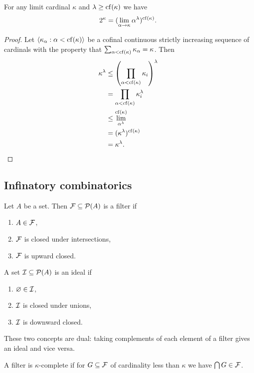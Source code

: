 \begin{proposition}
    For any limit cardinal \(\kappa\) and \(\lambda\geq\operatorname{cf}(\kappa)\) we have
    \[
        2^{\kappa}=(\lim_{\alpha\to\kappa}\alpha^{\lambda})^{\operatorname{cf}(\kappa)}.
    \]

    \begin{proof}
        Let \(\left<\kappa_{\alpha}:\alpha<\operatorname{cf}(\kappa)\right>\) be a cofinal
        continuous strictly increasing sequence of cardinals with the property
        that \(\sum_{\alpha<\operatorname{cf}(\kappa)}\kappa_{\alpha}=\kappa\). Then
        \begin{align*}
            \kappa^{\lambda} & \leq\left(\prod_{\alpha<\operatorname{cf}(\kappa)}\kappa_{i}\right)^{\lambda} \\
                             & =\prod_{\alpha<\operatorname{cf}(\kappa)}\kappa_{i}^{\lambda}                 \\
                             & \leq\lim_{\alpha^{\lambda}}^{\operatorname{cf}(\kappa)}                       \\
                             & =(\kappa^{\lambda})^{\operatorname{cf}(\kappa)}                               \\
                             & =\kappa^{\lambda}.
        \end{align*}
    \end{proof}
\end{proposition}

\subsection{Infinatory combinatorics}
\begin{definition}
    Let \(A\) be a set. Then \(\mathcal{F}\subseteq\mathcal{P}(A)\) is a filter
    if
    \begin{enumerate}
        \item \(A\in\mathcal{F}\),
        \item \(\mathcal{F}\) is closed under intersections,
        \item \(\mathcal{F}\) is upward closed.
    \end{enumerate}
    A set \(\mathcal{I}\subseteq\mathcal{P}(A)\) is an ideal if
    \begin{enumerate}
        \item \(\varnothing\in\mathcal{I}\),
        \item \(\mathcal{I}\) is closed under unions,
        \item \(\mathcal{I}\) is downward closed.
    \end{enumerate}
    These two concepts are dual: taking complements of each element of a filter
    gives an ideal and vice versa.

    A filter is \(\kappa\)-complete if for \(G\subseteq\mathcal{F}\) of cardinality
    less than \(\kappa\) we have \(\bigcap G\in\mathcal{F}\).
\end{definition}

